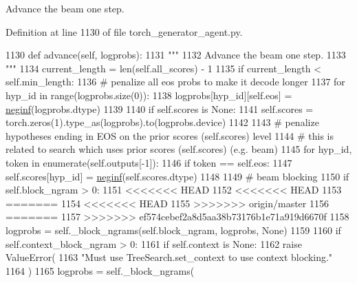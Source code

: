 \begin{DoxyVerb}Advance the beam one step.
\end{DoxyVerb}
 

Definition at line 1130 of file torch\+\_\+generator\+\_\+agent.\+py.


\begin{DoxyCode}
1130     \textcolor{keyword}{def }advance(self, logprobs):
1131         \textcolor{stringliteral}{"""}
1132 \textcolor{stringliteral}{        Advance the beam one step.}
1133 \textcolor{stringliteral}{        """}
1134         current\_length = len(self.all\_scores) - 1
1135         \textcolor{keywordflow}{if} current\_length < self.min\_length:
1136             \textcolor{comment}{# penalize all eos probs to make it decode longer}
1137             \textcolor{keywordflow}{for} hyp\_id \textcolor{keywordflow}{in} range(logprobs.size(0)):
1138                 logprobs[hyp\_id][self.eos] = \hyperlink{namespaceparlai_1_1utils_1_1misc_a68c44ca571de7149b683539db659c330}{neginf}(logprobs.dtype)
1139 
1140         \textcolor{keywordflow}{if} self.scores \textcolor{keywordflow}{is} \textcolor{keywordtype}{None}:
1141             self.scores = torch.zeros(1).type\_as(logprobs).to(logprobs.device)
1142 
1143         \textcolor{comment}{# penalize hypotheses ending in EOS on the prior scores (self.scores) level}
1144         \textcolor{comment}{# this is related to search which uses prior scores (self.scores) (e.g. beam)}
1145         \textcolor{keywordflow}{for} hyp\_id, token \textcolor{keywordflow}{in} enumerate(self.outputs[-1]):
1146             \textcolor{keywordflow}{if} token == self.eos:
1147                 self.scores[hyp\_id] = \hyperlink{namespaceparlai_1_1utils_1_1misc_a68c44ca571de7149b683539db659c330}{neginf}(self.scores.dtype)
1148 
1149         \textcolor{comment}{# beam blocking}
1150         \textcolor{keywordflow}{if} self.block\_ngram > 0:
1151 <<<<<<< HEAD
1152 <<<<<<< HEAD
1153 =======
1154 <<<<<<< HEAD
1155 >>>>>>> origin/master
1156 =======
1157 >>>>>>> ef574cebef2a8d5aa38b73176b1e71a919d6670f
1158             logprobs = self.\_block\_ngrams(self.block\_ngram, logprobs, \textcolor{keywordtype}{None})
1159 
1160         \textcolor{keywordflow}{if} self.context\_block\_ngram > 0:
1161             \textcolor{keywordflow}{if} self.context \textcolor{keywordflow}{is} \textcolor{keywordtype}{None}:
1162                 \textcolor{keywordflow}{raise} ValueError(
1163                     \textcolor{stringliteral}{"Must use TreeSearch.set\_context to use context blocking."}
1164                 )
1165             logprobs = self.\_block\_ngrams(

\end{DoxyCode}
